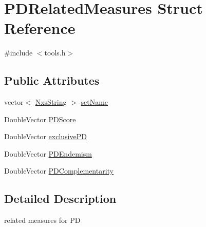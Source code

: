 \hypertarget{structPDRelatedMeasures}{
\section{PDRelatedMeasures Struct Reference}
\label{structPDRelatedMeasures}
}


{\ttfamily \#include $<$tools.h$>$}\subsection*{Public Attributes}
\begin{DoxyCompactItemize}
\item 
vector$<$ \hyperlink{classNxsString}{NxsString} $>$ \hyperlink{structPDRelatedMeasures_ae7a4293fcd630131eb7eaf2a66f7540d}{setName}
\item 
DoubleVector \hyperlink{structPDRelatedMeasures_a2d20e4c7fb660ce8571723b3116032c4}{PDScore}
\item 
DoubleVector \hyperlink{structPDRelatedMeasures_a2f579e206a60fb498f1f096364056fc4}{exclusivePD}
\item 
DoubleVector \hyperlink{structPDRelatedMeasures_a995d83e663bf9bf39dbcf8e0c93b3c53}{PDEndemism}
\item 
DoubleVector \hyperlink{structPDRelatedMeasures_a441d326b67a831588dc07ae3aeb996a4}{PDComplementarity}
\end{DoxyCompactItemize}


\subsection{Detailed Description}
related measures for PD 

